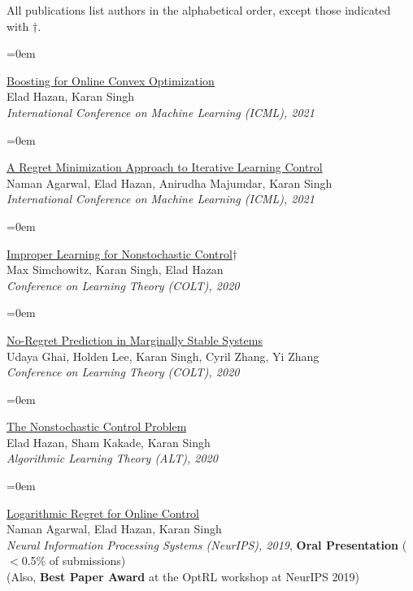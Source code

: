 \documentclass{scrartcl}
\newcommand{\Description}[1]{\hangindent=0em\hangafter=0\noindent\raggedright {#1}\par\normalsize\vspace{1em}}
\begin{document}
\begin{cv}{}
\vspace{0.5em}

All publications list authors in the alphabetical order, except those indicated with $\dagger$.

\vspace{0.5em}

\Description{\href{https://proceedings.mlr.press/v139/hazan21a/hazan21a.pdf}{Boosting for Online Convex Optimization}
\\ Elad Hazan, Karan Singh\\ \textit{International Conference on Machine Learning (ICML), 2021}
}

\Description{\href{https://proceedings.mlr.press/v139/agarwal21b/agarwal21b.pdf}{A Regret Minimization Approach to Iterative Learning Control
}\\ Naman Agarwal, Elad Hazan, Anirudha Majumdar, Karan Singh\\ \textit{International Conference on Machine Learning (ICML), 2021}}

\Description{\href{https://proceedings.mlr.press/v125/simchowitz20a/simchowitz20a.pdf}{Improper Learning for Nonstochastic Control$\dagger$
}\\ Max Simchowitz, Karan Singh, Elad Hazan\\ \textit{Conference on Learning Theory (COLT), 2020}}

\Description{\href{https://proceedings.mlr.press/v125/ghai20a/ghai20a.pdf}{No-Regret Prediction in Marginally Stable Systems
}\\ Udaya Ghai, Holden Lee, Karan Singh, Cyril Zhang, Yi Zhang\\ \textit{Conference on Learning Theory (COLT), 2020}}

\Description{\href{https://proceedings.mlr.press/v117/hazan20a/hazan20a.pdf}{The Nonstochastic Control Problem}\\Elad Hazan, Sham Kakade, Karan Singh \\ \textit{Algorithmic Learning Theory (ALT), 2020}}

\Description{\href{https://papers.nips.cc/paper/2019/file/78719f11fa2df9917de3110133506521-Paper.pdf}{Logarithmic Regret for Online Control}\\ Naman Agarwal, Elad Hazan, Karan Singh\\ \textit{Neural Information Processing Systems (NeurIPS), 2019}, \textbf{Oral Presentation} ($<$0.5\% of submissions) \\ (Also, \textbf{Best Paper Award} at the OptRL workshop at NeurIPS 2019)}



\end{cv}
\end{document}

